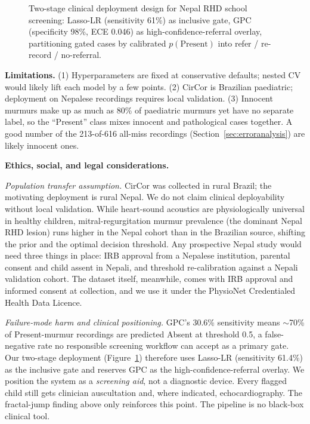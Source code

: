 \documentclass[10pt,twocolumn]{article}
\begin{document}
\begin{figure}[!t]
\caption{Two-stage clinical deployment design for Nepal RHD school screening: Lasso-LR (sensitivity 61\%) as inclusive gate, GPC (specificity 98\%, ECE 0.046) as high-confidence-referral overlay, partitioning gated cases by calibrated $p(\text{Present})$ into refer / re-record / no-referral.}
\label{fig:deployment}
\end{figure}

\textbf{Limitations.} (1) Hyperparameters are fixed at conservative defaults; nested CV would likely lift each model by a few points. (2) CirCor is Brazilian paediatric; deployment on Nepalese recordings requires local validation. (3) Innocent murmurs make up as much as 80\% of paediatric murmurs yet have no separate label, so the ``Present'' class mixes innocent and pathological cases together. A good number of the 213-of-616 all-miss recordings (Section~\ref{sec:erroranalysis}) are likely innocent ones.

\textbf{Ethics, social, and legal considerations.}

\textit{Population transfer assumption.} CirCor was collected in rural Brazil; the motivating deployment is rural Nepal. We do not claim clinical deployability without local validation. While heart-sound acoustics are physiologically universal in healthy children, mitral-regurgitation murmur prevalence (the dominant Nepal RHD lesion) runs higher in the Nepal cohort than in the Brazilian source, shifting the prior and the optimal decision threshold. Any prospective Nepal study would need three things in place: IRB approval from a Nepalese institution, parental consent and child assent in Nepali, and threshold re-calibration against a Nepali validation cohort. The dataset itself, meanwhile, comes with IRB approval and informed consent at collection, and we use it under the PhysioNet Credentialed Health Data Licence.

\textit{Failure-mode harm and clinical positioning.} GPC's 30.6\% sensitivity means $\sim$70\% of Present-murmur recordings are predicted Absent at threshold 0.5, a false-negative rate no responsible screening workflow can accept as a primary gate. Our two-stage deployment (Figure~\ref{fig:deployment}) therefore uses Lasso-LR (sensitivity 61.4\%) as the inclusive gate and reserves GPC as the high-confidence-referral overlay. We position the system as a \textit{screening aid}, not a diagnostic device. Every flagged child still gets clinician auscultation and, where indicated, echocardiography. The fractal-jump finding above only reinforces this point. The pipeline is no black-box clinical tool.
\end{document}
